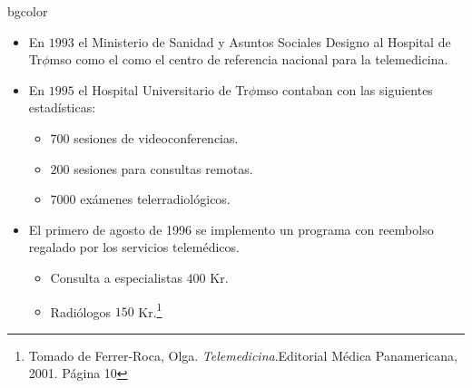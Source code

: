 \documentclass[xcolor=svgnames]{beamer}
\begin{document}
\begin{frame}
  \begin{beamercolorbox}[rounded=true, center, shadow=true]{bgcolor}
    \begin{itemize}
      \item En $1993$ el Ministerio de Sanidad y Asuntos Sociales Designo al Hospital de Tr$\phi$mso como el como el centro de referencia nacional para la telemedicina.\pause
      \item En $1995$ el Hospital Universitario de Tr$\phi$mso contaban con las siguientes estadísticas:
	  \begin{itemize}
	   \item $700$ sesiones de videoconferencias.
	   \item $200$ sesiones para consultas remotas.
	   \item $7000$ exámenes telerradiológicos.
	  \end{itemize} \pause
      \item El primero de agosto de 1996 se implemento un programa con reembolso regalado por los servicios telemédicos.
	\begin{itemize}
	 \item Consulta a especialistas  $400$ Kr.
	 \item Radiólogos $150$ Kr.\footnote{Tomado de Ferrer-Roca, Olga. \textit{ Telemedicina}.Editorial Médica Panamericana, 2001. Página 10}
	\end{itemize}
    \end{itemize}
  \end{beamercolorbox}
\end{frame}
\end{document}
